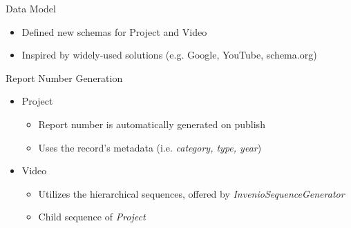 \documentclass{beamer}
\begin{document}
  	\begin{frame}{Data Model}
    	\begin{itemize}
    	  \item{Defined new schemas for \alert{Project} and \alert{Video}}
   	  \item{Inspired by widely-used solutions (e.g. Google, YouTube, schema.org)}
	  \end{itemize}
	\end{frame}
	
	\begin{frame}{Report Number Generation}
	  \begin{itemize}	  
    	  \item{\alert{Project}}
      	\begin{itemize}
      	  \item{Report number is automatically generated on publish}
      	  \item{Uses the record's metadata (i.e. \emph{category, type, year})}
    	  \end{itemize}
    	  \item{\alert{Video}}
      	\begin{itemize}
      	  \item{Utilizes the hierarchical sequences, offered by \emph{InvenioSequenceGenerator}}
      	  \item{Child sequence of \emph{Project}}
    	  \end{itemize}
  	  \end{itemize}
	\end{frame}
\end{document}
